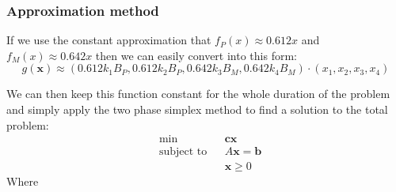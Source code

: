 \documentclass{article}
\begin{document}
\subsubsection{Approximation method}
\par If we use the constant approximation that $f_P(x) \approx 0.612x$ and $f_M(x) \approx 0.642x$ then we can easily convert into this form:
\begin{equation}
    g(\boldsymbol{x}) \approx(0.612 k_1 B_P, 0.612 k_2 B_P, 0.642 k_3 B_M, 0.642 k_4 B_M) \cdot(x_1,x_2,x_3,x_4)
\end{equation}
\par We can then keep this function constant for the whole duration of the problem and simply apply the two phase simplex method to find a solution to the total problem:
\begin{equation*}
\begin{aligned}
    &\min & & \boldsymbol{cx} \\
    &\text{subject to} & & A\boldsymbol{x}=\boldsymbol{b}\\
    & & &\boldsymbol{x} \geq 0
\end{aligned}
\end{equation*}
Where 
\end{document}
